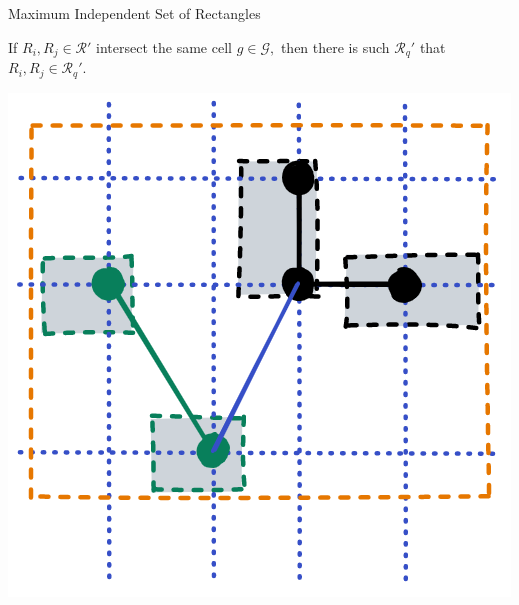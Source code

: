 \documentclass[handout,usenames,dvipsnames]{beamer}
\begin{document}
\begin{frame}{Maximum Independent Set of Rectangles}
    \begin{minipage}{0.5\textwidth}
    \begin{lm}
        \label{lemma11}
        If $R_i, R_j \in \mathcal R'$ intersect the same cell $g \in \mathcal G,$ then there is such $\mathcal R_q'$ that $R_i, R_j \in \mathcal R_q'.$
    \end{lm}
    \end{minipage}\hfill
    \begin{minipage}{0.4\textwidth}
        \includegraphics[width=\textwidth]{rq.png}
    \end{minipage} \\
\end{frame}
\end{document}
